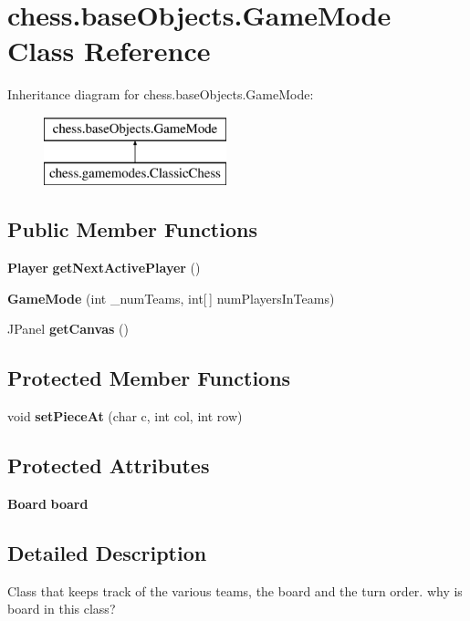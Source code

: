 \section{chess.\+base\+Objects.\+Game\+Mode Class Reference}
\label{classchess_1_1base_objects_1_1_game_mode}
Inheritance diagram for chess.\+base\+Objects.\+Game\+Mode\+:\begin{figure}[H]
\begin{center}
\leavevmode
\includegraphics[height=2.000000cm]{classchess_1_1base_objects_1_1_game_mode}
\end{center}
\end{figure}
\subsection*{Public Member Functions}
\begin{DoxyCompactItemize}
\item 
{\bf Player} {\bf get\+Next\+Active\+Player} ()
\item 
{\bf Game\+Mode} (int \+\_\+num\+Teams, int[$\,$] num\+Players\+In\+Teams)
\item 
J\+Panel {\bf get\+Canvas} ()
\end{DoxyCompactItemize}
\subsection*{Protected Member Functions}
\begin{DoxyCompactItemize}
\item 
void {\bf set\+Piece\+At} (char c, int col, int row)
\end{DoxyCompactItemize}
\subsection*{Protected Attributes}
\begin{DoxyCompactItemize}
\item 
{\bf Board} {\bf board}
\end{DoxyCompactItemize}


\subsection{Detailed Description}
Class that keeps track of the various teams, the board and the turn order. why is board in this class? 

